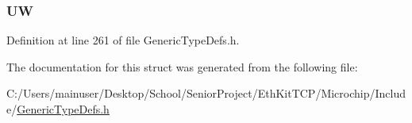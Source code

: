 \subsubsection[{U\+W}]{ U\+W}\label{struct_u_i_n_t64___v_a_l_1_1_____p_a_c_k_e_d_af5ef418064766b8266ce97005574f3be}


Definition at line 261 of file Generic\+Type\+Defs.\+h.



The documentation for this struct was generated from the following file\+:\begin{DoxyCompactItemize}
\item 
C\+:/\+Users/mainuser/\+Desktop/\+School/\+Senior\+Project/\+Eth\+Kit\+T\+C\+P/\+Microchip/\+Include/\hyperlink{_generic_type_defs_8h}{Generic\+Type\+Defs.\+h}\end{DoxyCompactItemize}
